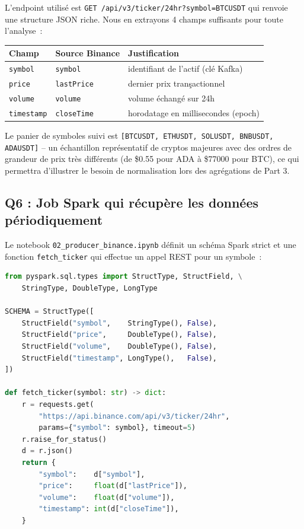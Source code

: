 \documentclass{RapportINPTCLOUD}
\begin{document}
L'endpoint utilis\'{e} est \texttt{GET /api/v3/ticker/24hr?symbol=BTCUSDT} qui renvoie une structure JSON riche. Nous en extrayons 4 champs suffisants pour toute l'analyse~:
\begin{center}
\begin{tabular}{|l|l|l|}
\hline
\textbf{Champ} & \textbf{Source Binance} & \textbf{Justification} \\
\hline
\texttt{symbol} & \texttt{symbol} & identifiant de l'actif (cl\'{e} Kafka) \\
\texttt{price} & \texttt{lastPrice} & dernier prix tran\c{s}actionnel \\
\texttt{volume} & \texttt{volume} & volume \'{e}chang\'{e} sur 24h \\
\texttt{timestamp} & \texttt{closeTime} & horodatage en millisecondes (epoch) \\
\hline
\end{tabular}
\end{center}

Le panier de symboles suivi est \texttt{[BTCUSDT, ETHUSDT, SOLUSDT, BNBUSDT, ADAUSDT]} -- un \'{e}chantillon repr\'{e}sentatif de cryptos majeures avec des ordres de grandeur de prix tr\`{e}s diff\'{e}rents (de \$0.55 pour ADA \`{a} \$77000 pour BTC), ce qui permettra d'illustrer le besoin de normalisation lors des agr\'{e}gations de Part 3.

\subsection{Q6 : Job Spark qui r\'{e}cup\`{e}re les donn\'{e}es p\'{e}riodiquement}

Le notebook \texttt{02\_producer\_binance.ipynb} d\'{e}finit un sch\'{e}ma Spark strict et une fonction \texttt{fetch\_ticker} qui effectue un appel REST pour un symbole~:

\begin{lstlisting}[style=code, language=Python, caption=Sch\'{e}ma et helper REST]
from pyspark.sql.types import StructType, StructField, \
    StringType, DoubleType, LongType

SCHEMA = StructType([
    StructField("symbol",    StringType(), False),
    StructField("price",     DoubleType(), False),
    StructField("volume",    DoubleType(), False),
    StructField("timestamp", LongType(),   False),
])

def fetch_ticker(symbol: str) -> dict:
    r = requests.get(
        "https://api.binance.com/api/v3/ticker/24hr",
        params={"symbol": symbol}, timeout=5)
    r.raise_for_status()
    d = r.json()
    return {
        "symbol":    d["symbol"],
        "price":     float(d["lastPrice"]),
        "volume":    float(d["volume"]),
        "timestamp": int(d["closeTime"]),
    }
\end{lstlisting}
\end{document}
